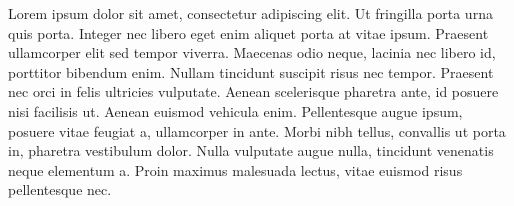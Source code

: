 
Lorem ipsum dolor sit amet, consectetur adipiscing elit. Ut fringilla porta urna quis porta. Integer nec libero eget enim aliquet porta at vitae ipsum. Praesent ullamcorper elit sed tempor viverra. Maecenas odio neque, lacinia nec libero id, porttitor bibendum enim. Nullam tincidunt suscipit risus nec tempor. Praesent nec orci in felis ultricies vulputate. Aenean scelerisque pharetra ante, id posuere nisi facilisis ut. Aenean euismod vehicula enim. Pellentesque augue ipsum, posuere vitae feugiat a, ullamcorper in ante. Morbi nibh tellus, convallis ut porta in, pharetra vestibulum dolor. Nulla vulputate augue nulla, tincidunt venenatis neque elementum a. Proin maximus malesuada lectus, vitae euismod risus pellentesque nec.
